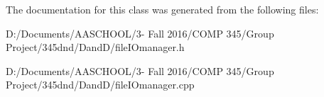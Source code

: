 The documentation for this class was generated from the following files\+:\begin{DoxyCompactItemize}
\item 
D\+:/\+Documents/\+A\+A\+S\+C\+H\+O\+O\+L/3-\/ Fall 2016/\+C\+O\+M\+P 345/\+Group Project/345dnd/\+Dand\+D/file\+I\+Omanager.\+h\item 
D\+:/\+Documents/\+A\+A\+S\+C\+H\+O\+O\+L/3-\/ Fall 2016/\+C\+O\+M\+P 345/\+Group Project/345dnd/\+Dand\+D/file\+I\+Omanager.\+cpp\end{DoxyCompactItemize}
